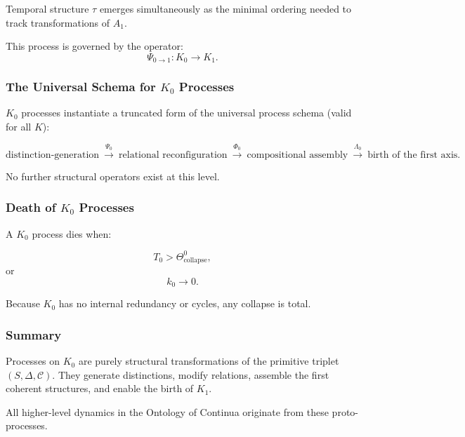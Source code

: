 Temporal structure $\tau$ emerges simultaneously as the minimal ordering
needed to track transformations of $A_1$.

This process is governed by the operator:
\[
\Psi_{0\to1}: K_0 \to K_1.
\]

\subsubsection{The Universal Schema for \texorpdfstring{$K_0$}{K_0} Processes}

$K_0$ processes instantiate a truncated form of the universal process schema
(valid for all $K$):

\[
\text{distinction-generation} 
\ \xrightarrow{\Psi_0}
\ \text{relational reconfiguration}
\ \xrightarrow{\Phi_0}
\ \text{compositional assembly}
\ \xrightarrow{\Lambda_0}
\ \text{birth of the first axis}.
\]

No further structural operators exist at this level.

\subsubsection{Death of \texorpdfstring{$K_0$}{K_0} Processes}

A $K_0$ process dies when:

\[
T_0 > \Theta^0_{\mathrm{collapse}},
\]
or
\[
k_0 \to 0.
\]

Because $K_0$ has no internal redundancy or cycles, any collapse is total.

\subsubsection{Summary}

Processes on $K_0$ are purely structural transformations of the primitive
triplet $(S, \Delta, \mathcal{C})$.  
They generate distinctions, modify relations, assemble the first coherent
structures, and enable the birth of $K_1$.

All higher-level dynamics in the Ontology of Continua originate from these
proto-processes.
